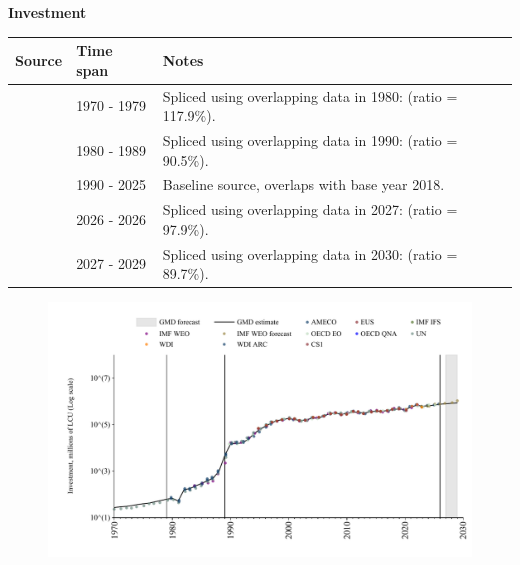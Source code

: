 \documentclass[12pt,a4paper,landscape]{article}
\begin{document}
\begin{adjustbox}{max totalsize={\paperwidth}{\paperheight},center}
\begin{minipage}[t][\textheight][t]{\textwidth}
\begin{figure}[H]
\end{figure}
\end{minipage}
\end{adjustbox}
\begin{adjustbox}{max totalsize={\paperwidth}{\paperheight},center}
\begin{minipage}[t][\textheight][t]{\textwidth}
\vspace*{0.5cm}
{}
\begin{center}
{\Large\bfseries Investment}
\end{center}
\vspace{0.5cm}
\begin{table}[H]
\centering
\small
\begin{tabular}{|l|l|l|}
\hline
\textbf{Source} & \textbf{Time span} & \textbf{Notes} \\
\hline
\rowcolor{white}\cite{UN}& 1970 - 1979 &Spliced using overlapping data in 1980: (ratio = 117.9\%). \\
\rowcolor{lightgray}\cite{AMECO}& 1980 - 1989 &Spliced using overlapping data in 1990: (ratio = 90.5\%). \\
\rowcolor{white}\cite{OECD_EO}& 1990 - 2025 &Baseline source, overlaps with base year 2018. \\
\rowcolor{lightgray}\cite{AMECO}& 2026 - 2026 &Spliced using overlapping data in 2027: (ratio = 97.9\%). \\
\rowcolor{white}\cite{IMF_WEO_forecast}& 2027 - 2029 &Spliced using overlapping data in 2030: (ratio = 89.7\%). \\
\hline
\end{tabular}
\end{table}
\begin{figure}[H]
\centering
\includegraphics[width=\textwidth,height=0.6\textheight,keepaspectratio]{graphs/POL_inv.pdf}
\end{figure}
\end{minipage}
\end{adjustbox}
\end{document}
